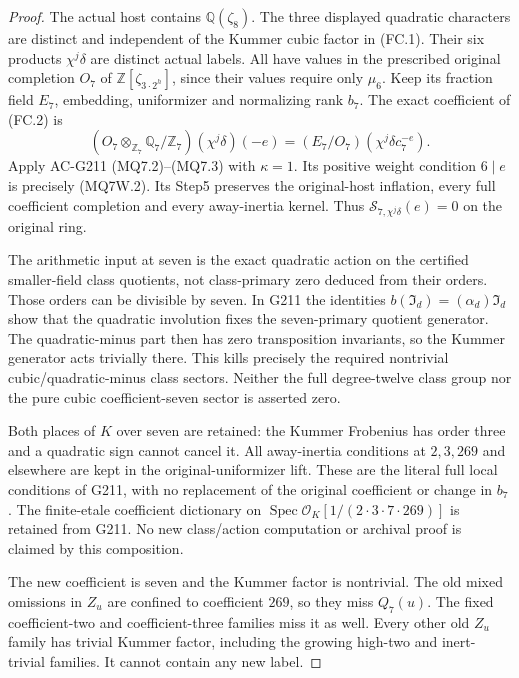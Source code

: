 \begin{proof}
The actual host contains $\mathbb Q(\zeta_8)$.
The three displayed quadratic characters are distinct and
independent of the Kummer cubic factor in (FC.1).
Their six products $\chi^j\delta$ are distinct actual labels.
All have values in the prescribed original completion $O_7$
of $\mathbb Z[\zeta_{3\cdot2^h}]$, since their values require
only $\mu_6$. Keep its fraction field $E_7$, embedding,
uniformizer and normalizing rank $b_7$.
The exact coefficient of (FC.2) is
\[
 (O_7\otimes_{\mathbb Z_7}\mathbb Q_7/\mathbb Z_7)
                               (\chi^j\delta)(-e)
       =(E_7/O_7)(\chi^j\delta c_7^{-e}).
 \tag{MQ7W.8}
\]
Apply AC-G211 (MQ7.2)--(MQ7.3) with $\kappa=1$.
Its positive weight condition $6\mid e$ is precisely
(MQ7W.2). Its Step5 preserves the original-host inflation,
every full coefficient completion and every away-inertia kernel.
Thus $\mathcal S_{7,\chi^j\delta}(e)=0$ on the original ring.

The arithmetic input at seven is the exact quadratic action
on the certified smaller-field class quotients, not class-primary
zero deduced from their orders. Those orders can be divisible
by seven. In G211 the identities
$b(\mathfrak I_d)=(\alpha_d)\mathfrak I_d$ show that the
quadratic involution fixes the seven-primary quotient generator.
The quadratic-minus part then has zero transposition invariants,
so the Kummer generator acts trivially there. This kills precisely
the required nontrivial cubic/quadratic-minus class sectors.
Neither the full degree-twelve class group nor the pure cubic
coefficient-seven sector is asserted zero.

Both places of $K$ over seven are retained: the Kummer Frobenius
has order three and a quadratic sign cannot cancel it.
All away-inertia conditions at $2,3,269$ and elsewhere are kept
in the original-uniformizer lift. These are the literal full
local conditions of G211, with no replacement of the original
coefficient or change in $b_7$.
The finite-etale coefficient dictionary on
$\operatorname{Spec}\mathcal O_K[1/(2\cdot3\cdot7\cdot269)]$
is retained from G211. No new class/action computation or
archival proof is claimed by this composition.

The new coefficient is seven and the Kummer factor is nontrivial.
The old mixed omissions in $Z_u$ are confined to coefficient
$269$, so they miss $Q_7(u)$. The fixed coefficient-two and
coefficient-three families miss it as well.
Every other old $Z_u$ family has trivial Kummer factor,
including the growing high-two and inert-trivial families.
It cannot contain any new label.


\end{proof}
